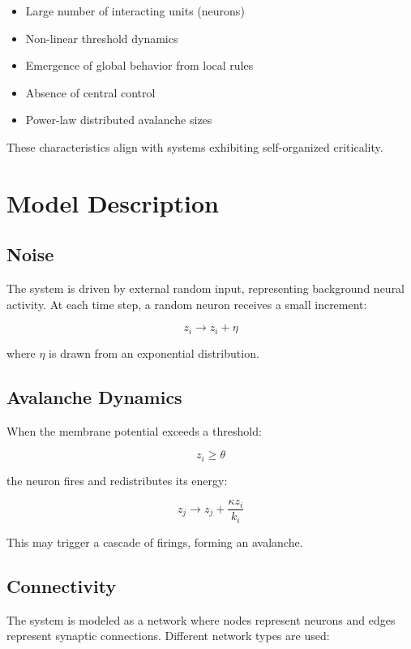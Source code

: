 \documentclass[12pt]{article}
\begin{document}
\begin{itemize}
\item Large number of interacting units (neurons)
\item Non-linear threshold dynamics
\item Emergence of global behavior from local rules
\item Absence of central control
\item Power-law distributed avalanche sizes
\end{itemize}

These characteristics align with systems exhibiting self-organized criticality.

\section{Model Description}

\subsection{Noise}
The system is driven by external random input, representing background neural activity. At each time step, a random neuron receives a small increment:

\begin{equation}
z_i \rightarrow z_i + \eta
\end{equation}

where $\eta$ is drawn from an exponential distribution.

\subsection{Avalanche Dynamics}
When the membrane potential exceeds a threshold:

\begin{equation}
z_i \geq \theta
\end{equation}

the neuron fires and redistributes its energy:

\begin{equation}
z_j \rightarrow z_j + \frac{\kappa z_i}{k_i}
\end{equation}

This may trigger a cascade of firings, forming an avalanche.

\subsection{Connectivity}
The system is modeled as a network where nodes represent neurons and edges represent synaptic connections. Different network types are used:
\end{document}

